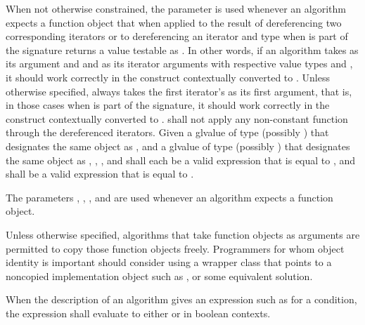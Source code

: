 \pnum
When not otherwise constrained, the  parameter is used
whenever an algorithm expects a function object that when applied
to the result of dereferencing two corresponding iterators or
to dereferencing an iterator and type 
when  is part of the signature
returns a value testable as .
In other words,
if an algorithm takes  as its argument and
 and  as its iterator arguments
with respective value types  and ,
it should work correctly in the construct
 contextually converted to .
Unless otherwise specified,
 always takes the first iterator's 
as its first argument, that is, in those cases when 
is part of the signature, it should work correctly in the construct
 contextually converted to .
 shall not apply any non-constant function
through the dereferenced iterators.
Given a glvalue  of type (possibly ) 
that designates the same object as , and
a glvalue  of type (possibly ) 
that designates the same object as ,
,
, and
shall each be a valid expression that is equal to
, and
shall be a valid expression that is equal to
.

\pnum
The parameters
,
,
,
and 
are used
whenever an algorithm expects a function object.

\pnum
\begin{note}
Unless otherwise specified, algorithms that take function objects as arguments
are permitted to copy those function objects freely.
Programmers for whom object identity is important should consider
using a wrapper class that points to a noncopied implementation object
such as , or some equivalent solution.
\end{note}

\pnum
When the description of an algorithm gives an expression such as
 for a condition, the expression
shall evaluate to either  or  in boolean contexts.

